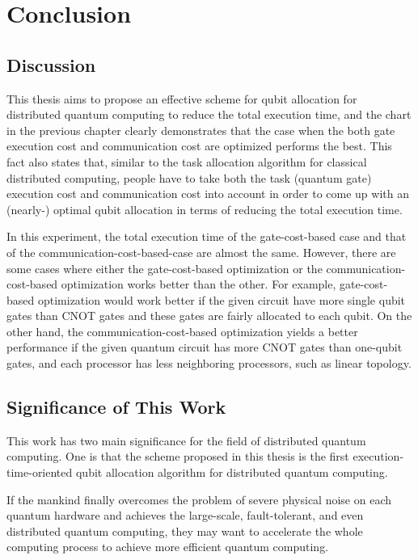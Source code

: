 \chapter{Conclusion}
\label{discussion}

\section{Discussion} 

This thesis aims to propose an effective scheme for qubit allocation for distributed quantum computing to reduce the total execution time, and the chart in the previous chapter clearly demonstrates that the case when the both gate execution cost and communication cost are optimized performs the best.  This fact also states that, similar to the task allocation algorithm for classical distributed computing, people have to take both the task (quantum gate) execution cost and communication cost into account in order to come up with an (nearly-) optimal qubit allocation in terms of reducing the total execution time.

 In this experiment, the total execution time of the gate-cost-based case and that of the communication-cost-based-case are almost the same. However, there are some cases where either the gate-cost-based optimization or the communication-cost-based optimization works better than the other.  For example, gate-cost-based optimization would work better if the given circuit have more single qubit gates than CNOT gates and these gates are fairly allocated to each qubit.  On the other hand, the communication-cost-based optimization yields a better performance if the given quantum circuit has more CNOT gates than one-qubit gates, and each processor has less neighboring processors, such as linear topology.
 
 \section{Significance of This Work}

 This work has two main significance for the field of distributed quantum computing. 
 One is that the scheme proposed in this thesis is the first execution-time-oriented qubit allocation algorithm for distributed quantum computing. 
 
  If the mankind finally overcomes the problem of severe physical noise on each quantum hardware and achieves the large-scale, fault-tolerant, and even distributed quantum computing, they may want to accelerate the whole computing process to achieve more efficient quantum computing. 
  
